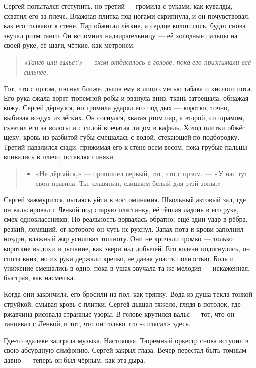 \documentclass[12pt,a4paper]{book}
\newenvironment{dialogue}{\begin{quote}\itshape\begin{itemize}\item[]}{\end{itemize}\end{quote}}
\newenvironment{innerthought}{\begin{quote}\small\itshape}{\end{quote}}
\begin{document}
Сергей попытался отступить, но третий --- громила с руками, как кувалды, --- схватил его за плечо. Влажная плитка под ногами скрипнула, и он почувствовал, как его толкают к стене. Пар обжигал лёгкие, а сердце колотилось, будто снова звучал ритм танго. Он вспомнил надзирательницу --- её холодные пальцы на своей руке, её шаги, чёткие, как метроном.

\begin{innerthought}
«Танго или вальс?» --- эхом отдавалось в голове, пока его прижимали всё сильнее.
\end{innerthought}

Тот, что с орлом, шагнул ближе, дыша ему в лицо смесью табака и кислого пота. Его рука сжала ворот тюремной робы и рванула вниз, ткань затрещала, обнажая кожу. Сергей дёрнулся, но громила ударил его под дых --- коротко, точно, выбивая воздух из лёгких. Он согнулся, хватая ртом пар, а второй, со шрамом, схватил его за волосы и с силой впечатал лицом в кафель. Холод плитки обжёг щеку, кровь из разбитой губы смешалась с водой, стекающей по подбородку. Третий навалился сзади, прижимая его к стене всем весом, пока грубые пальцы впивались в плечи, оставляя синяки.

\begin{dialogue}
«Не дёргайся,» --- прошипел первый, тот, что с орлом. --- «У нас тут свои правила. Ты, славянин, слишком белый для этой зоны.»
\end{dialogue}

Сергей зажмурился, пытаясь уйти в воспоминания. Школьный актовый зал, где он вальсировал с Ленкой под старую пластинку, её тёплая ладонь в его руке, смех одноклассников. Но реальность ворвалась обратно: ещё один удар в рёбра, резкий, ломящий, от которого он чуть не рухнул. Запах пота и крови заполнил ноздри, влажный жар усиливал тошноту. Они не кричали громко --- только короткие выдохи и рычание, как звери над добычей. Его колени подогнулись, он сполз вниз, но их руки держали крепко, не давая упасть полностью. Боль и унижение смешались в одно, пока в ушах звучала та же мелодия --- искажённая, быстрая, как насмешка.

Когда они закончили, его бросили на пол, как тряпку. Вода из душа текла тонкой струйкой, смывая кровь с плитки. Сергей дышал тяжело, глядя в потолок, где ржавчина рисовала странные узоры. В голове крутился вальс --- тот, что он танцевал с Ленкой, и тот, что он только что «сплясал» здесь.

Где-то вдалеке заиграла музыка. Настоящая. Тюремный оркестр снова вступил в свою абсурдную симфонию. Сергей закрыл глаза. Вечер перестал быть томным давно --- теперь он был чёрным, как эта дыра.
\end{document}
